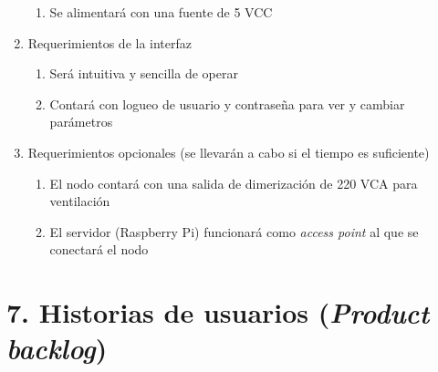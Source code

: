 \documentclass[
11pt, %
]{charter}
\begin{document}
\begin{enumerate}
\begin{enumerate}
			\item Se alimentará con una fuente de 5 VCC
		\end{enumerate}
	\item Requerimientos de la interfaz
		\begin{enumerate}
			\item Será intuitiva y sencilla de operar
			\item Contará con logueo de usuario y contraseña para ver y cambiar parámetros
		\end{enumerate}
	\item Requerimientos opcionales (se llevarán a cabo si el tiempo es suficiente)
		\begin{enumerate}
			\item El nodo contará con una salida de dimerización de 220 VCA para ventilación
			\item El servidor (Raspberry Pi) funcionará como \textit{access point} al que se conectará el nodo
		\end{enumerate}
\end{enumerate}

\section{7. Historias de usuarios (\textit{Product backlog})}
\label{sec:backlog}
\end{document}

